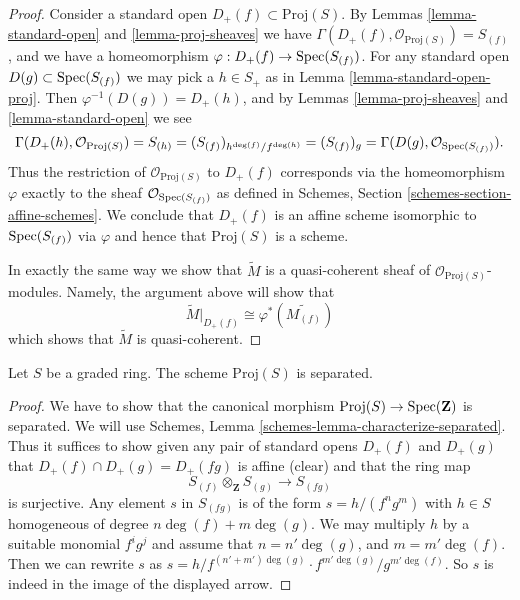 \begin{proof}
Consider a standard open $D_{+}(f) \subset \text{Proj}(S)$.
By Lemmas \ref{lemma-standard-open} and \ref{lemma-proj-sheaves}
we have $\Gamma(D_{+}(f), \mathcal{O}_{\text{Proj}(S)}) = S_{(f)}$, and
we have a homeomorphism $\varphi : D_{+}(f) \to \mathop{\rm Spec}(S_{(f)})$.
For any standard open $D(g) \subset \mathop{\rm Spec}(S_{(f)})$ we may
pick a $h \in S_{+}$ as in Lemma \ref{lemma-standard-open-proj}.
Then $\varphi^{-1}(D(g)) = D_{+}(h)$, and by
Lemmas \ref{lemma-proj-sheaves} and \ref{lemma-standard-open} we see
$$
\Gamma(D_{+}(h), \mathcal{O}_{\text{Proj}(S)})
=
S_{(h)}
=
(S_{(f)})_{h^{\deg(f)}/f^{\deg(h)}}
=
(S_{(f)})_g
=
\Gamma(D(g), \mathcal{O}_{\mathop{\rm Spec}(S_{(f)})}).
$$
Thus the restriction of $\mathcal{O}_{\text{Proj}(S)}$ to
$D_{+}(f)$ corresponds via the homeomorphism $\varphi$
exactly to the sheaf $\mathcal{O}_{\mathop{\rm Spec}(S_{(f)})}$
as defined in Schemes, Section \ref{schemes-section-affine-schemes}.
We conclude that $D_{+}(f)$ is an affine scheme isomorphic to
$\mathop{\rm Spec}(S_{(f)})$ via $\varphi$ and
hence that $\text{Proj}(S)$ is a scheme.

\medskip\noindent
In exactly the same way we show that $\widetilde M$ is a
quasi-coherent sheaf of $\mathcal{O}_{\text{Proj}(S)}$-modules.
Namely, the argument above will show that
$$
\widetilde M|_{D_{+}(f)} \cong \varphi^*\left(\widetilde{M_{(f)}}\right)
$$
which shows that $\widetilde M$ is quasi-coherent.
\end{proof}

\begin{lemma}
\label{lemma-proj-separated}
Let $S$ be a graded ring.
The scheme $\text{Proj}(S)$ is separated.
\end{lemma}

\begin{proof}
We have to show that the canonical morphism
$\text{Proj}(S) \to \mathop{\rm Spec}(\mathbf{Z})$
is separated.
We will use Schemes, Lemma \ref{schemes-lemma-characterize-separated}.
Thus it suffices to show given any pair of standard opens
$D_{+}(f)$ and $D_{+}(g)$ that $D_{+}(f) \cap D_{+}(g) = D_{+}(fg)$
is affine (clear) and that the ring map
$$
S_{(f)} \otimes_{\mathbf{Z}} S_{(g)} \longrightarrow S_{(fg)}
$$
is surjective. Any element $s$ in $S_{(fg)}$ is of
the form $s = h/(f^ng^m)$ with $h \in S$ homogeneous of degree
$n\deg(f) + m\deg(g)$. We may multiply $h$ by a suitable
monomial $f^ig^j$ and assume that $n = n' \deg(g)$, and
$m = m' \deg(f)$. Then we can rewrite $s$ as
$s = h/f^{(n' + m')\deg(g)} \cdot f^{m'\deg(g)}/g^{m'\deg(f)}$.
So $s$ is indeed in the image of the displayed arrow.
\end{proof}

